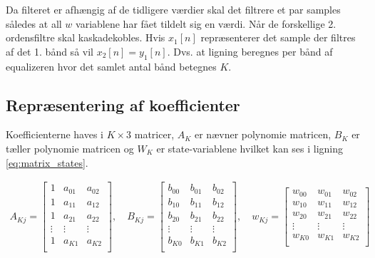     Da filteret er afhængig af de tidligere værdier skal det filtrere et par samples således at all $w$ variablene 
    har fået tildelt sig en værdi.
Når de forskellige 2. ordensfiltre skal kaskadekobles. Hvis $x_{1}[n]$ repræsenterer det sample der filtres af det 1. bånd så vil $x_{2}[n] = y_{1}[n]$.
    Dvs. at ligning \label{eq:iir_diff_real} beregnes per bånd af equalizeren hvor det samlet antal bånd betegnes $K$.\\
\subsection{Repræsentering af koefficienter}

    Koefficienterne haves i $K \times 3$ matricer,
    $A_K$ er nævner polynomie matricen, $B_K$ er tæller polynomie matricen
   og $W_K$ er state-variablene hvilket kan ses i ligning \ref{eq:matrix_states}.  

   \begin{align}
   A_{Kj} = \left[\begin{matrix}
   1 			& a_{01} 	& a_{02} \\
   1 			& a_{11} 	& a_{12} \\
   1 			& a_{21} 	& a_{22} \\
   \vdots 		& \vdots 	&  \vdots \\
   1 			& a_{K1} 	& a_{K2} \\
   \end{matrix}
   \right], \quad
      B_{Kj} = \left[\begin{matrix}
   b_{00}		& b_{01} 	& b_{02} \\
   b_{10}		& b_{11} 	& b_{12} \\
   b_{20}		& b_{21} 	& b_{22} \\
   \vdots 		& \vdots 	&  \vdots \\
   b_{K0}		& b_{K1} 	& b_{K2} \\
   \end{matrix}
   \right], \quad
      w_{Kj} = \left[\begin{matrix}
   w_{00}		& w_{01} 	& w_{02} \\
   w_{10}		& w_{11} 	& w_{12} \\
   w_{20}		& w_{21} 	& w_{22} \\
   \vdots 		& \vdots 	&  \vdots \\
   w_{K0}		& w_{K1} 	& w_{K2} \\
   \end{matrix}
   \right]
   \label{eq:matrix_states}
   \end{align}

